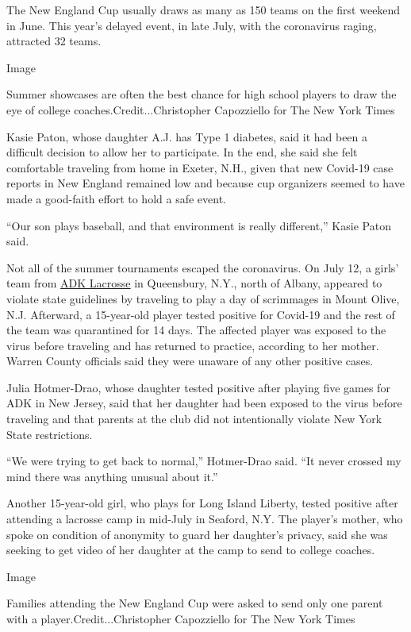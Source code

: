 The New England Cup usually draws as many as 150 teams on the first
weekend in June. This year's delayed event, in late July, with the
coronavirus raging, attracted 32 teams.

Image

Summer showcases are often the best chance for high school players to
draw the eye of college coaches.Credit...Christopher Capozziello for The
New York Times

Kasie Paton, whose daughter A.J. has Type 1 diabetes, said it had been a
difficult decision to allow her to participate. In the end, she said she
felt comfortable traveling from home in Exeter, N.H., given that new
Covid-19 case reports in New England remained low and because cup
organizers seemed to have made a good-faith effort to hold a safe event.

``Our son plays baseball, and that environment is really different,''
Kasie Paton said.

Not all of the summer tournaments escaped the coronavirus. On July 12, a
girls' team from
\href{https://www.timesunion.com/news/article/Queensbury-superintendent-traveled-to-NJ-with-15421769.php}{ADK
Lacrosse} in Queensbury, N.Y., north of Albany, appeared to violate
state guidelines by traveling to play a day of scrimmages in Mount
Olive, N.J. Afterward, a 15-year-old player tested positive for Covid-19
and the rest of the team was quarantined for 14 days. The affected
player was exposed to the virus before traveling and has returned to
practice, according to her mother. Warren County officials said they
were unaware of any other positive cases.

Julia Hotmer-Drao, whose daughter tested positive after playing five
games for ADK in New Jersey, said that her daughter had been exposed to
the virus before traveling and that parents at the club did not
intentionally violate New York State restrictions.

``We were trying to get back to normal,'' Hotmer-Drao said. ``It never
crossed my mind there was anything unusual about it.''

Another 15-year-old girl, who plays for Long Island Liberty, tested
positive after attending a lacrosse camp in mid-July in Seaford, N.Y.
The player's mother, who spoke on condition of anonymity to guard her
daughter's privacy, said she was seeking to get video of her daughter at
the camp to send to college coaches.

Image

Families attending the New England Cup were asked to send only one
parent with a player.Credit...Christopher Capozziello for The New York
Times


